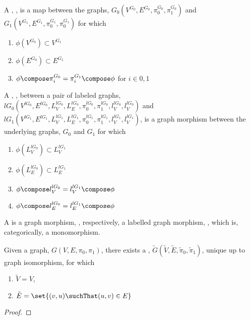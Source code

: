 \documentclass[a4paper]{amsart}
\begin{document}
\begin{definition}
A , , is a map between the graphs,
$G_0(V^{G_0}, E^{G_0}, \pi^{G_0}_0, \pi^{G_0}_1)$ and $G_1(V^{G_1}, E^{G_1}, \pi^{G_1}_0,
\pi^{G_1}_0)$ for which
\begin{enumerate}
\item $\phi(V^{G_0}) \subset V^{G_1}$
\item $\phi(E^{G_0}) \subset E^{G_1}$
\item $\phi \compose \pi^{G_0}_i = \pi^{G_1}_i \compose \phi$ for $i \in {0, 1}$
\end{enumerate}

A , , between a pair of labeled
graphs, $lG_0(V^{lG_0}, E^{lG_0}, L^{lG_0}_V, L^{lG_0}_E, \pi^{lG_0}_0, \pi^{lG_0}_1,
l^{lG_0}_V, l^{lG_0}_V)$ and $lG_1(V^{lG_1}, E^{lG_1}, L^{lG_1}_V, L^{lG_1}_E,
\pi^{lG_1}_0, \pi^{lG_1}_1, l^{lG_1}_V, l^{lG_1}_V)$, is a graph morphism between the
underlying graphs, $G_0$ and $G_1$ for which
\begin{enumerate}
\item $\phi(L^{lG_0}_V) \subset L^{lG_1}_V$
\item $\phi(L^{lG_0}_E) \subset L^{lG_1}_E$
\item $\phi \compose l^{lG_0}_V = l^{lG_1}_V \compose \phi$
\item $\phi \compose l^{lG_0}_E = l^{lG_1}_E \compose \phi$
\end{enumerate}
\end{definition}

\begin{definition}
A  is a graph morphism, , respectively, a
labelled graph morphism, , which is, categorically, a monomorphism.
\end{definition}

\begin{lemma}
Given a graph, $G(V, E, \pi_0, \pi_1)$, there exists a ,
$\tilde{G}(\tilde{V}, \tilde{E}, \tilde{\pi}_0, \tilde{\pi}_1)$, unique up to graph 
isomorphism, for which
\begin{enumerate}
\item $\tilde{V} = V$,
\item $\tilde{E} = \set{(v, u) \suchThat (u, v) \in E}$
\end{enumerate}
\end{lemma}

\begin{proof}
\end{proof}
\end{document}
